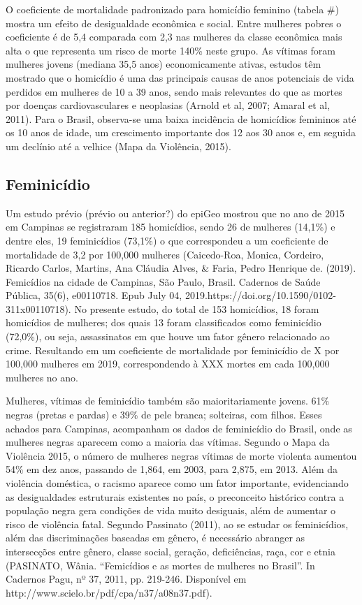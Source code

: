 O coeficiente de mortalidade padronizado para homicídio feminino (tabela #) mostra um efeito de desigualdade econômica e social. Entre mulheres pobres o coeficiente é de 5,4 comparada com 2,3 nas mulheres da classe econômica mais alta o que representa um risco de morte 140\% neste grupo.    
As vítimas foram mulheres jovens (mediana 35,5 anos) economicamente ativas, estudos têm mostrado que o homicídio é uma das principais causas de anos potenciais de vida perdidos em mulheres de 10 a 39 anos, sendo mais relevantes do que as mortes por doenças cardiovasculares e neoplasias (Arnold et al, 2007; Amaral et al, 2011). Para o Brasil, observa-se uma baixa incidência de homicídios femininos até os 10 anos de idade, um crescimento importante dos 12 aos 30 anos  e, em seguida um declínio até a velhice (Mapa da Violência, 2015).

\subsection{Feminicídio}

Um estudo prévio (prévio ou anterior?) do epiGeo mostrou que no ano de 2015 em Campinas se registraram 185 homicídios, sendo 26 de mulheres (14,1\%)  e dentre eles, 19 feminicídios (73,1\%) o que correspondeu a um coeficiente de mortalidade de 3,2 por 100,000 mulheres (Caicedo-Roa, Monica, Cordeiro, Ricardo Carlos, Martins, Ana Cláudia Alves, & Faria, Pedro Henrique de. (2019). Femicídios na cidade de Campinas, São Paulo, Brasil. Cadernos de Saúde Pública, 35(6), e00110718. Epub July 04, 2019.https://doi.org/10.1590/0102-311x00110718). No presente estudo, do total de 153 homicídios, 18 foram homicídios de mulheres; dos quais 13 foram classificados como feminicídio (72,0\%), ou seja, assassinatos em que houve um fator gênero relacionado ao crime. Resultando em um coeficiente de mortalidade por  feminicídio de X por 100,000 mulheres em 2019, correspondendo à XXX mortes em cada 100,000 mulheres no ano. 

Mulheres, vítimas de feminicídio também são maioritariamente jovens. 61\% negras (pretas e pardas) e 39\% de pele branca; solteiras, com filhos.  Esses achados para Campinas, acompanham os dados de feminicídio do Brasil, onde as mulheres negras aparecem como a maioria  das vítimas. Segundo o Mapa da Violência 2015, o número de mulheres negras vítimas de morte violenta aumentou 54\% em dez anos, passando de 1,864, em 2003, para 2,875, em 2013. Além da violência doméstica, o racismo aparece como um fator importante, evidenciando as desigualdades estruturais existentes no país, o preconceito histórico contra a população negra gera condições de vida muito desiguais, além de aumentar o risco de violência fatal. Segundo Passinato (2011), ao se estudar os feminicídios, além das discriminações baseadas em gênero, é necessário abranger as intersecções entre gênero, classe social, geração, deficiências, raça, cor e etnia (PASINATO, Wânia. “Femicídios e as mortes de mulheres no Brasil”. In Cadernos Pagu, nº 37, 2011, pp. 219-246. Disponível em http://www.scielo.br/pdf/cpa/n37/a08n37.pdf).

